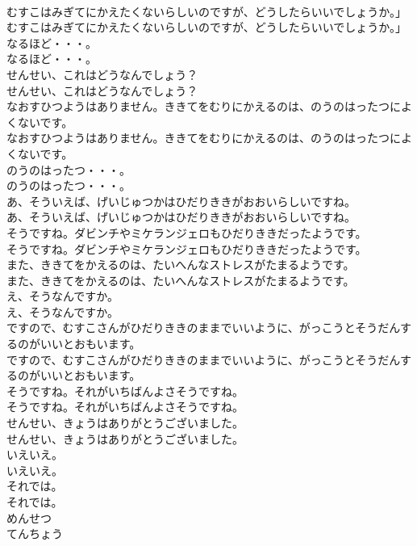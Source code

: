 \documentclass[8pt]{extreport}
\begin{document}
\begin{CJK}{UTF8}{min}
\\	むすこはみぎてにかえたくないらしいのですが、どうしたらいいでしょうか。」
\\	むすこはみぎてにかえたくないらしいのですが、どうしたらいいでしょうか。」
\\	なるほど・・・。
\\	なるほど・・・。
\\	せんせい、これはどうなんでしょう？
\\	せんせい、これはどうなんでしょう？
\\	なおすひつようはありません。ききてをむりにかえるのは、のうのはったつによくないです。
\\	なおすひつようはありません。ききてをむりにかえるのは、のうのはったつによくないです。
\\	のうのはったつ・・・。
\\	のうのはったつ・・・。
\\	あ、そういえば、げいじゅつかはひだりききがおおいらしいですね。
\\	あ、そういえば、げいじゅつかはひだりききがおおいらしいですね。
\\	そうですね。ダビンチやミケランジェロもひだりききだったようです。
\\	そうですね。ダビンチやミケランジェロもひだりききだったようです。
\\	また、ききてをかえるのは、たいへんなストレスがたまるようです。
\\	また、ききてをかえるのは、たいへんなストレスがたまるようです。
\\	え、そうなんですか。
\\	え、そうなんですか。
\\	ですので、むすこさんがひだりききのままでいいように、がっこうとそうだんするのがいいとおもいます。
\\	ですので、むすこさんがひだりききのままでいいように、がっこうとそうだんするのがいいとおもいます。
\\	そうですね。それがいちばんよさそうですね。
\\	そうですね。それがいちばんよさそうですね。
\\	せんせい、きょうはありがとうございました。
\\	せんせい、きょうはありがとうございました。
\\	いえいえ。
\\	いえいえ。
\\	それでは。
\\	それでは。
\\	めんせつ
\\	てんちょう

\end{CJK}
\end{document}
